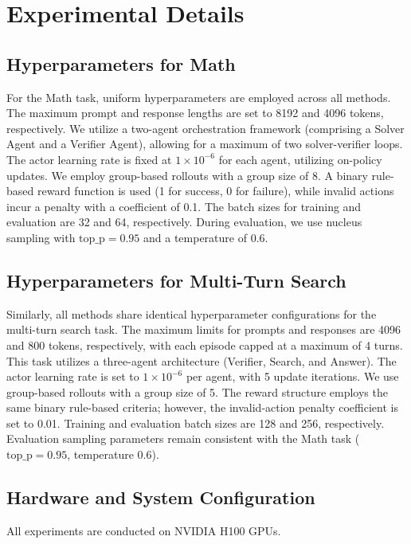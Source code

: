 \documentclass[]{fairmeta}
\theoremstyle{plain}
\theoremstyle{definition}
\theoremstyle{remark}
\begin{document}
\section{Experimental Details}
\label{app:experimental_details}

\subsection{Hyperparameters for Math}
\label{app:experimental_details_math}
For the Math task, uniform hyperparameters are employed across all methods. The maximum prompt and response lengths are set to 8192 and 4096 tokens, respectively. We utilize a two-agent orchestration framework (comprising a Solver Agent and a Verifier Agent), allowing for a maximum of two solver-verifier loops. The actor learning rate is fixed at $1 \times 10^{-6}$ for each agent, utilizing on-policy updates. We employ group-based rollouts with a group size of 8. A binary rule-based reward function is used (1 for success, 0 for failure), while invalid actions incur a penalty with a coefficient of 0.1. The batch sizes for training and evaluation are 32 and 64, respectively. During evaluation, we use nucleus sampling with $\text{top\_p}=0.95$ and a temperature of 0.6.

\subsection{Hyperparameters for Multi-Turn Search}
\label{app:experimental_details_search}
Similarly, all methods share identical hyperparameter configurations for the multi-turn search task. The maximum limits for prompts and responses are 4096 and 800 tokens, respectively, with each episode capped at a maximum of 4 turns. This task utilizes a three-agent architecture (Verifier, Search, and Answer). The actor learning rate is set to $1 \times 10^{-6}$ per agent, with 5 update iterations. We use group-based rollouts with a group size of 5. The reward structure employs the same binary rule-based criteria; however, the invalid-action penalty coefficient is set to 0.01. Training and evaluation batch sizes are 128 and 256, respectively. Evaluation sampling parameters remain consistent with the Math task ($\text{top\_p}=0.95$, temperature 0.6).

\subsection{Hardware and System Configuration}
All experiments are conducted on NVIDIA H100 GPUs. 
\end{document}
